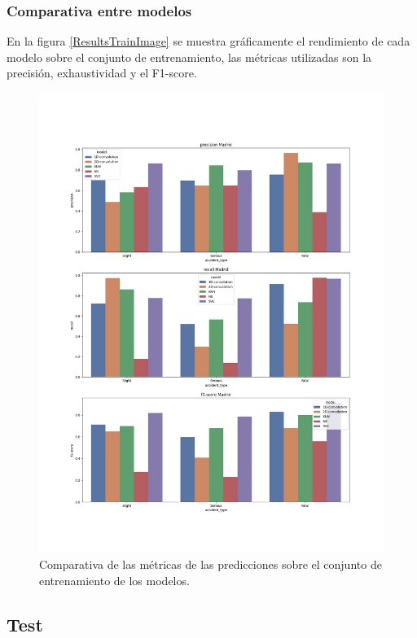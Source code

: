   \subsubsection{Comparativa entre modelos}

  En la figura \eqref{ResultsTrainImage} se muestra gráficamente el rendimiento de cada modelo sobre el conjunto de entrenamiento, las métricas utilizadas son la precisión, exhaustividad y el F1-score.

  \begin{figure}[H]
      \centering
      \includegraphics[width=13cm]{archivos/5.Resultados/ComparativaTrain}
      \caption{Comparativa de las métricas de las predicciones sobre el conjunto de entrenamiento de los modelos.}
      \label{ResultsTrainImage}
   \end{figure}



\subsection{Test}


